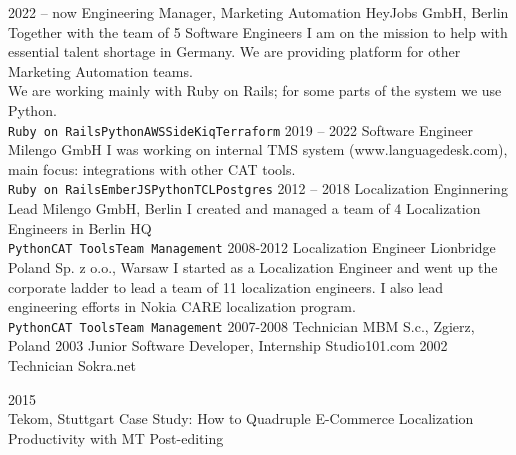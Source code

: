 \documentclass[8pt]{developercv} %
\begin{document}
\begin{entrylist}
	\entry
		{2022 -- now}
		{Engineering Manager, Marketing Automation}
		{HeyJobs GmbH, Berlin}
		{Together with the team of 5 Software Engineers I am on the mission to help with essential talent shortage in Germany. We are providing platform for other Marketing Automation teams.\\ We are working mainly with Ruby on Rails; for some parts of the system we use Python.
		\\ \texttt{Ruby on Rails}\slashsep\texttt{Python}\slashsep\texttt{AWS}\slashsep\texttt{SideKiq}\slashsep\texttt{Terraform}}
	\entry
		{2019 -- 2022}
		{Software Engineer}
		{Milengo GmbH}
		{I was working on internal TMS system (www.languagedesk.com), main focus: integrations with other CAT tools.
			\\ \texttt{Ruby on Rails}\slashsep\texttt{EmberJS}\slashsep\texttt{Python}\slashsep\texttt{TCL}\slashsep\texttt{Postgres}}
	\entry
		{2012 -- 2018}
		{Localization Enginnering Lead}
		{Milengo GmbH, Berlin}
		{I created and managed a team of 4 Localization Engineers in Berlin HQ
		\\ \texttt{Python}\slashsep\texttt{CAT Tools}\slashsep\texttt{Team Management}}
	\entry
		{2008-2012}
		{Localization Engineer}
		{Lionbridge Poland Sp. z o.o., Warsaw}
		{I started as a Localization Engineer and went up the corporate ladder to lead a team of 11 localization engineers.
		I also lead engineering efforts in Nokia CARE localization program.
		\\ \texttt{Python}\slashsep\texttt{CAT Tools}\slashsep\texttt{Team Management}}
	\entry
		{2007-2008}
		{Technician}
		{MBM S.c., Zgierz, Poland }
		{ }
	\entry
		{2003}
		{Junior Software Developer, Internship}
		{Studio101.com }
		{ }
	\entry
		{2002}
		{Technician}
		{Sokra.net }
		{ }
\end{entrylist}


\begin{entrylist}
	\entry
		{2015}
		{ \\ }
		{Tekom, Stuttgart}
		{Case Study: How to Quadruple E-Commerce Localization Productivity with 
		MT Post-editing }
\end{entrylist}



\end{document}

